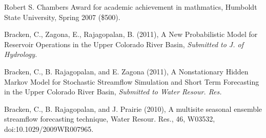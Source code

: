 \documentclass[10pt,a4paper]{scrartcl}
\begin{document}
\begin{cv}{}
\begin{cvlist}{}
	        \item Robert S. Chambers Award for academic achievement in mathmatics, Humboldt State University, Spring 2007 (\$500).
        \end{cvlist}
        
        \begin{cvlist}{}\label{pub}
        	\item Bracken, C., Zagona, E., Rajagopalan, B. (2011), A New Probabilistic Model for Reservoir Operations in the Upper Colorado River Basin, {\it Submitted to J. of Hydrology.}
	        \item Bracken, C., B. Rajagopalan, and E. Zagona (2011), A Nonstationary Hidden Markov Model for Stochastic Streamflow Simulation and Short Term Forecasting in the Upper Colorado River Basin, {\it Submitted to Water Resour. Res.} 
            \item   Bracken, C., B. Rajagopalan, and J. Prairie (2010), A multisite seasonal ensemble streamflow forecasting technique, Water Resour. Res., 46, W03532, doi:10.1029/2009WR007965.
        \end{cvlist}
      \end{cv}
\end{document}
